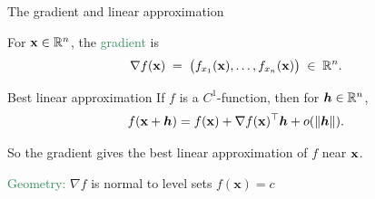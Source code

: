 \documentclass{beamer}
\begin{document}



%
%
%







\begin{frame}[label=LinAp]{The gradient and linear approximation}

For ${\bf x}\in\mathbb R^n$, the \textcolor{SeaGreen}{gradient} is
\[
\nabla f({\bf x})\;=\;\big(f_{x_1}({\bf x}),\dots,f_{x_n}({\bf x})\big)\;\in \;\mathbb R^n.
\]

\vskip 6pt
\begin{alertblock}{Best linear approximation}	
If $f$ is a $C^1$-function, then for $\boldsymbol h\in \mathbb R^n$,
\[
f({\bf x}+\boldsymbol h)=f({\bf x})+\nabla f({\bf x})^\top \boldsymbol h + o(\|\boldsymbol h\|).
\]

So the gradient gives the \alert{best linear approximation} of $f$ near ${\bf x}$.
\end{alertblock}
\textcolor{SeaGreen}{Geometry:} \(\nabla f\) is normal to level sets \(f(\mathbf{x})=c\)
\end{frame}
\end{document}
